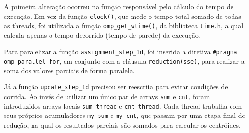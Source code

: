 \par A primeira alteração ocorreu na função responsável pelo cálculo do tempo de execução. Em vez da função \texttt{clock()}, que mede o tempo total somado de todas as threads, foi utilizada a função \texttt{omp\_get\_wtime()}, da biblioteca \texttt{time.h}, a qual calcula apenas o tempo decorrido (tempo de parede) da execução.

\par Para paralelizar a função \texttt{assignment\_step\_1d}, foi inserida a diretiva \texttt{\#pragma omp parallel for}, em conjunto com a cláusula \texttt{reduction(sse)}, para realizar a soma dos valores parciais de forma paralela.

\par Já a função \texttt{update\_step\_1d} precisou ser reescrita para evitar condições de corrida. Ao invés de utilizar um único par de arrays \texttt{sum} e \texttt{cnt}, foram introduzidos arrays locais \texttt{sum\_thread} e \texttt{cnt\_thread}. Cada thread trabalha com seus próprios acumuladores \texttt{my\_sum} e \texttt{my\_cnt}, que passam por uma etapa final de redução, na qual os resultados parciais são somados para calcular os centróides.